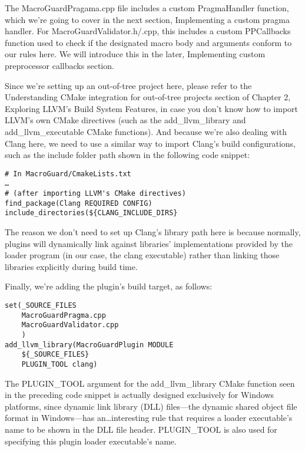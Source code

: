 The MacroGuardPragama.cpp file includes a custom PragmaHandler function, which we're going to cover in the next section, Implementing a custom pragma handler. For MacroGuardValidator.h/.cpp, this includes a custom PPCallbacks function used to check if the designated macro body and arguments conform to our rules here. We will introduce this in the later, Implementing custom preprocessor callbacks section.

Since we're setting up an out-of-tree project here, please refer to the Understanding CMake integration for out-of-tree projects section of Chapter 2, Exploring LLVM's Build System Features, in case you don't know how to import LLVM's own CMake directives (such as the add\_llvm\_library and add\_llvm\_executable CMake functions). And because we're also dealing with Clang here, we need to use a similar way to import Clang's build configurations, such as the include folder path shown in the following code snippet:

\begin{lstlisting}[style=styleCMake]
# In MacroGuard/CmakeLists.txt
…
# (after importing LLVM's CMake directives)
find_package(Clang REQUIRED CONFIG)
include_directories(${CLANG_INCLUDE_DIRS}
\end{lstlisting}

The reason we don't need to set up Clang's library path here is because normally, plugins will dynamically link against libraries' implementations provided by the loader program (in our case, the clang executable) rather than linking those libraries explicitly during build time.

Finally, we're adding the plugin's build target, as follows:

\begin{lstlisting}[style=styleCMake]
set(_SOURCE_FILES
	MacroGuardPragma.cpp
	MacroGuardValidator.cpp
	)
add_llvm_library(MacroGuardPlugin MODULE
	${_SOURCE_FILES}
	PLUGIN_TOOL clang)
\end{lstlisting}

\begin{tcolorbox}[colback=blue!5!white,colframe=blue!75!black, fonttitle=\bfseries,title=The PLUGIN\_TOOL argument]
\hspace*{0.7cm}The PLUGIN\_TOOL argument for the add\_llvm\_library CMake function seen in the preceding code snippet is actually designed exclusively for Windows platforms, since dynamic link library (DLL) files—the dynamic shared object file format in Windows—has an…interesting rule that requires a loader executable's name to be shown in the DLL file header. PLUGIN\_TOOL is also used for specifying this plugin loader executable's name.
\end{tcolorbox}

